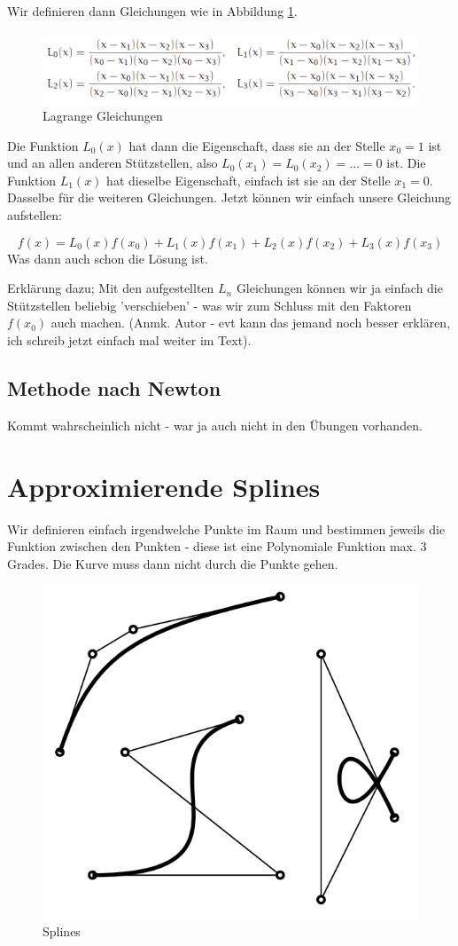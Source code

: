 Wir definieren dann Gleichungen wie in Abbildung \ref{fig:lagrange_gleichungen}.
\begin{figure}[!ht]
	\centering
	\includegraphics[width=0.7\linewidth]{fig/lagrange_gleichungen}
	\caption{Lagrange Gleichungen}
	\label{fig:lagrange_gleichungen}
\end{figure}
Die Funktion \(L_0(x)\) hat dann die Eigenschaft, dass sie an der Stelle \(x_0 = 1\) ist und an allen anderen Stützstellen, also \(L_0(x_1) = L_0(x_2) = \dots = 0\)  ist. Die Funktion \(L_1(x)\) hat dieselbe Eigenschaft, einfach ist sie an der Stelle \(x_1 = 0\). Dasselbe für die weiteren Gleichungen. Jetzt können wir einfach unsere Gleichung aufstellen:

\begin{displaymath}
f(x) = L_0(x)f(x_0) + L_1(x)f(x_1) + L_2(x)f(x_2)+ L_3(x)f(x_3)
\end{displaymath}
Was dann auch schon die Lösung ist.

Erklärung dazu; Mit den aufgestellten \(L_n\) Gleichungen können wir ja einfach die Stützstellen beliebig 'verschieben' - was wir zum Schluss mit den Faktoren \(f(x_0)\) auch machen. (Anmk. Autor - evt kann das jemand noch besser erklären, ich schreib jetzt einfach mal weiter im Text).
\subsection{Methode nach Newton}
Kommt wahrscheinlich nicht - war ja auch nicht in den Übungen vorhanden.
\section{Approximierende Splines}
Wir definieren einfach irgendwelche Punkte im Raum und bestimmen jeweils die Funktion zwischen den Punkten - diese ist eine Polynomiale Funktion max. 3 Grades. Die Kurve muss dann nicht durch die Punkte gehen.

\begin{figure}[!ht]
	\centering
	\includegraphics[width=0.3\linewidth]{fig/splines}
	\caption{Splines}
	\label{fig:splines}
\end{figure}

